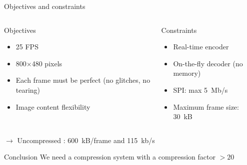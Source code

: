 \documentclass[10pt, notes]{beamer}
\begin{document}
\begin{frame}{Objectives and constraints}
    \begin{columns}
        \begin{column}{0.49\textwidth}
            \begin{exampleblock}{Objectives}
                \begin{itemize}
                    \item 25 FPS
                    \item 800$\times$480 pixels
                    \item Each frame must be perfect (no glitches, no tearing)
                    \item Image content flexibility 
                \end{itemize}
            \end{exampleblock}
        \end{column}

        \begin{column}{0.49\textwidth}
            \begin{alertblock}{Constraints}
                \begin{itemize}
                    \item Real-time encoder
                    \item On-the-fly decoder (no memory)
                    \item SPI: max \SI{5}{Mb/s}
                    \item Maximum frame size: \SI{30}{kB}
                \end{itemize}
            \end{alertblock}
        \end{column}
    \end{columns}

    $\to$ Uncompressed : \SI{600}{kB/frame} and \SI{115}{kb/s}

    \begin{block}{Conclusion}
        We need a compression system with a compression factor $> 20$      
    \end{block}
\end{frame}
\end{document}
